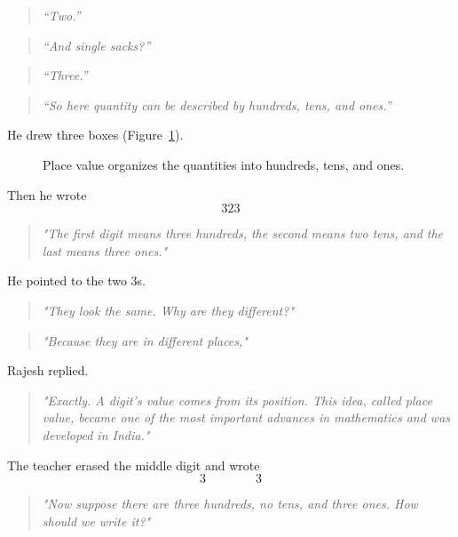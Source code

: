 \documentclass[11pt]{article}
\begin{document}
\begin{quote}
\emph{``Two.''}
\end{quote}
\begin{quote}
\emph{``And single sacks?''}
\end{quote}
\begin{quote}
\emph{``Three.''}
\end{quote}
\begin{quote}
\emph{``So here quantity can be described by hundreds, tens, and ones.''}
\end{quote}
He drew three boxes (Figure~\ref{fig:placevalue}).
\begin{figure}[ht]
\centering


\caption{
Place value organizes the quantities into hundreds, tens, and ones.
}
\label{fig:placevalue}
\end{figure}
Then he wrote
\[323\]
\begin{quote}
\emph{"The first digit means three hundreds, the second means two tens, and the last means three ones."}
\end{quote}
He pointed to the two 3s.
\begin{quote}
\emph{"They look the same. Why are they different?"}
\end{quote}
\begin{quote}
\emph{"Because they are in different places,"}
\end{quote}
Rajesh replied.
\begin{quote}
\emph{"Exactly. A digit's value comes from its position. This idea, called \emph{place value}, became one of the most important advances in mathematics and was developed in India."}
\end{quote}
The teacher erased the middle digit and wrote
\[ 3 \qquad\qquad 3 \]
\begin{quote}
\emph{"Now suppose there are three hundreds, no tens, and three ones. How should we write it?"}
\end{quote}
\end{document}
